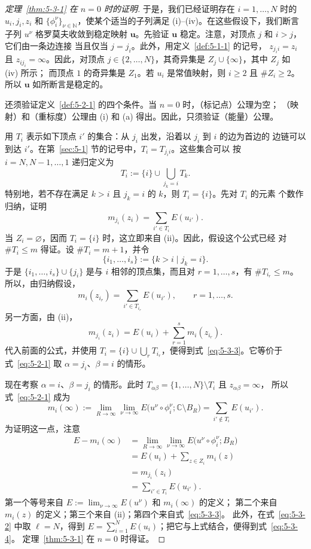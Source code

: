 \begin{proof}[定理~\ref{thm:5-3-1} 在 $n=0$ 时的证明]
于是，我们已经证明存在 $i=1,\ldots,N$ 时的
$u_i,j_i,z_i$ 和 $\{\phi_i^\nu\}_{\nu\in\mathbb N}$，使某个适当的子列满足
(i)--(iv)。在这些假设下，我们断言子列 $u^\nu$ 格罗莫夫收敛到稳定映射
$\mathbf u$。先验证 $\mathbf u$ 稳定。注意，对顶点 $j$ 和 $i>j$，它们由一条边连接
当且仅当 $j=j_i$。此外，用定义~\ref{def:5-1-1} 的记号，
$z_{j_i i}=z_i$ 且 $z_{i j_i}=\infty$。因此，对顶点
$j\in\{2,\ldots,N\}$，其奇异集是 $Z_j\cup\{\infty\}$，其中 $Z_j$ 如 (iv) 所示；
而顶点 $1$ 的奇异集是 $Z_1$。若 $u_i$ 是常值映射，则 $i\ge2$ 且 $\#Z_i\ge2$。
所以 $\mathbf u$ 如所断言是稳定的。

还须验证定义~\ref{def:5-2-1} 的四个条件。当 $n=0$ 时，（标记点）公理为空；
（映射）和（重标度）公理由 (i) 和 (a) 得出。因此，只须验证（能量）公理。

用 $T_i$ 表示如下顶点 $i'$ 的集合：从 $j_i$ 出发，沿着以 $j_i$ 到 $i$ 的边为首边的
边链可以到达 $i'$。在第~\ref{sec:5-1} 节的记号中，$T_i=T_{j_i i}$。这些集合可以
按 $i=N,N-1,\ldots,1$ 递归定义为
\[
  T_i:=\{i\}\cup\bigcup_{j_k=i}T_k.
\]
特别地，若不存在满足 $k>i$ 且 $j_k=i$ 的 $k$，则 $T_i=\{i\}$。先对 $T_i$ 的元素
个数作归纳，证明
\begin{equation}\label{eq:5-3-3}
  m_{j_i}(z_i)=\sum_{i'\in T_i}E(u_{i'}).
\end{equation}
当 $Z_i=\varnothing$，因而 $T_i=\{i\}$ 时，这立即来自 (ii)。因此，假设这个公式已经
对 $\#T_i\le m$ 得证。设 $\#T_i=m+1$，并令
\[
  \{i_1,\ldots,i_s\}:=\{k>i\mid j_k=i\}.
\]
于是 $\{i_1,\ldots,i_s\}\cup\{j_i\}$ 是与 $i$ 相邻的顶点集，而且对
$r=1,\ldots,s$，有 $\#T_{i_r}\le m$。所以，由归纳假设，
\[
  m_i(z_{i_r})=\sum_{i'\in T_{i_r}}E(u_{i'}),
  \qquad r=1,\ldots,s.
\]
另一方面，由 (ii)，
\[
  m_{j_i}(z_i)=E(u_i)+\sum_{r=1}^s m_i(z_{i_r}).
\]
代入前面的公式，并使用
$T_i=\{i\}\cup\bigcup_rT_{i_r}$，便得到式~\eqref{eq:5-3-3}。它等价于
式~\eqref{eq:5-2-1} 取 $\alpha=j_i$、$\beta=i$ 的情形。

现在考察 $\alpha=i$、$\beta=j_i$ 的情形。此时
$T_{\alpha\beta}=\{1,\ldots,N\}\setminus T_i$ 且 $z_{\alpha\beta}=\infty$，
所以式~\eqref{eq:5-2-1} 成为
\begin{equation}\label{eq:5-3-4}
  m_i(\infty):=\lim_{R\to\infty}\lim_{\nu\to\infty}
  E\bigl(u^\nu\circ\phi_i^\nu;\mathbb C\setminus B_R\bigr)
  =\sum_{i'\notin T_i}E(u_{i'}).
\end{equation}
为证明这一点，注意
\[
  \begin{aligned}
  E-m_i(\infty)
  &=\lim_{R\to\infty}\lim_{\nu\to\infty}
    E\bigl(u^\nu\circ\phi_i^\nu;B_R\bigr)\\
  &=E(u_i)+\sum_{z\in Z_i}m_i(z)\\
  &=m_{j_i}(z_i)\\
  &=\sum_{i'\in T_i}E(u_{i'}).
  \end{aligned}
\]
第一个等号来自 $E:=\lim_{\nu\to\infty}E(u^\nu)$ 和 $m_i(\infty)$ 的定义；
第二个来自 $m_i(z)$ 的定义；第三个来自 (ii)；第四个来自式~\eqref{eq:5-3-3}。
此外，在式~\eqref{eq:5-3-2} 中取 $\ell=N$，得到
$E=\sum_{i=1}^NE(u_i)$；把它与上式结合，便得到式~\eqref{eq:5-3-4}。
定理~\ref{thm:5-3-1} 在 $n=0$ 时得证。
\end{proof}

